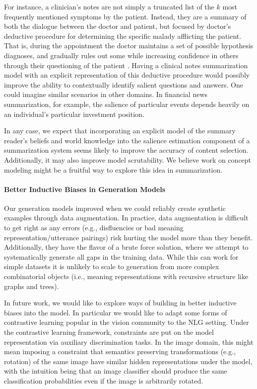 For instance, a clinician's notes are not simply a truncated list of the $k$
most frequently mentioned symptoms by the patient. Instead, they are a summary
of both the dialogue between the doctor and patient, but focused by doctor's
deductive procedure for determining the specific malady afflicting the patient.
That is, during the appointment the doctor maintains a set of possible
hypothesis diagnoses, and gradually rules out some while increasing confidence
in others through their questioning of the patient \citep{pivovarov2015}.
Having a clinical notes summarization model with an explicit representation of
this deductive procedure would possibly improve the ability to contextually
identify salient questions and answers.  One could imagine similar scenarios in
other domains. In financial news summarization, for example, the salience of
particular events depends heavily on an individual's particular investment
position. 

In any case,  we expect that incorporating an explicit model of the summary
reader's beliefs and world knowledge into the salience estimation component of
a summarization system seems likely to improve the accuracy of content
selection. Additionally, it may also improve model scrutability. We believe
work on concept modeling \citep{bosselut2019} might be a fruitful way to
explore this idea in summarization.

\paragraph{Better Inductive Biases in Generation Models} Our generation models
improved when we could reliably create synthetic examples through data
augmentation. In practice, data augmentation is difficult to get right as any
errors (e.g., disfluencies or bad meaning representation/utterance pairings)
risk hurting the model more than they benefit. Additionally, they have the
flavor of a brute force solution, where we attempt to systematically generate
all gaps in the training data. While this can work for simple datasets it is
unlikely to scale to generation from more complex combinatorial objects (i.e.,
meaning representations with recursive structure like graphs and trees).

In future work, we would like to explore ways of building in better inductive
biases into the model. In particular we would like to adapt some forms of
contrastive learning popular in the vision community \citep{chen2020} to the
NLG setting. Under the contrastive learning framework,  constraints are put on
the model representation via auxiliary discrimination tasks. In the image
domain, this might mean imposing a constraint that semantics preserving
transformations (e.g., rotation) of the same image have similar hidden
representations under the model, with the intuition being that an image
classifier should produce the same classification probabilities even if the
image is arbitrarily rotated.

